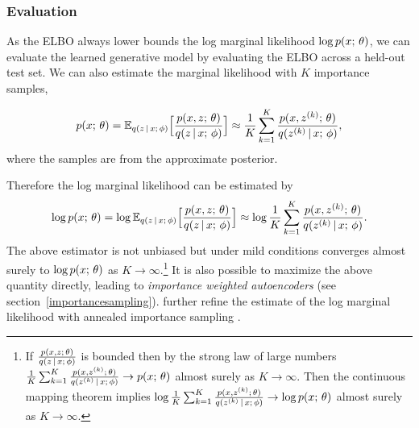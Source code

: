 \documentclass{article}
\begin{document}
\subsubsection{Evaluation}\label{eval}
As the ELBO always lower bounds the log marginal likelihood $\log p(x ; \, \theta)$, we can evaluate
the learned generative model by evaluating the ELBO across a held-out test set. 
We can also estimate the marginal likelihood with $K$ importance samples,

\[ p(x ; \, \theta) = \mathbb{E}_{q(z \,|\, x ; \, \phi)}\Big[ \frac{p(x, z ; \, \theta)}{q(z \,|\, x ; \, \phi)} \Big] \approx  \frac{1}{K} \sum_{k=1}^K \frac{p(x, z^{(k)} ; \, \theta)}{q(z^{(k)} \,|\, x ; \, \phi)},\]
where the samples are from the approximate posterior.

Therefore the log marginal likelihood can be estimated by
\[ \log p(x ; \, \theta) = \log \mathbb{E}_{q(z \,|\, x ; \, \phi)}\Big[ \frac{p(x, z ; \, \theta)}{q(z \,|\, x ; \, \phi)} \Big] \approx \log   \frac{1}{K} \sum_{k=1}^K \frac{p(x, z^{(k)} ; \, \theta)}{q(z^{(k)} \,|\, x ; \, \phi)}.\]
The above estimator is not unbiased but under mild conditions converges almost surely to
$\log p(x ; \, \theta)$ as $K \rightarrow \infty$.\footnote{If $\frac{p(x,z ; \, \theta)}{q(z \,|\, x ; \, \phi)}$ is bounded then by the strong law of large numbers $\frac{1}{K} \sum_{k=1}^K \frac{p(x, z^{(k)} ; \, \theta)}{q(z^{(k)} \,|\, x ; \, \phi)} \rightarrow p(x ; \, \theta)$ almost surely as $K \rightarrow \infty$.
Then the continuous mapping theorem implies $\log \frac{1}{K} \sum_{k=1}^K \frac{p(x, z^{(k)} ; \, \theta)}{q(z^{(k)} \,|\, x ; \, \phi)} \rightarrow \log p(x ; \, \theta)$ almost surely as $K \rightarrow \infty$.} It is also possible to maximize the above quantity directly, leading to \emph{importance weighted autoencoders} \citep{Burda2015} (see section~\ref{importancesampling}).
\cite{Wu2017quant} further refine the estimate of the log marginal likelihood with annealed
importance sampling \citep{neal2001}.
\end{document}
